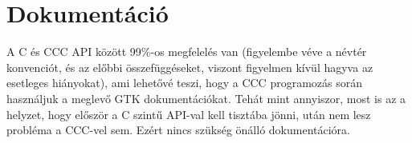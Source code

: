 \section{Dokumentáció}
A C és CCC API között  99\%-os megfelelés van
(figyelembe véve a névtér konvenciót, és az előbbi összefüggéseket, 
viszont figyelmen kívül hagyva az esetleges hiányokat), 
ami lehetővé teszi, hogy a CCC programozás során használjuk a meglevő 
GTK dokumentációkat. Tehát mint annyiszor, most is az a helyzet,
hogy először a C szintű API-val kell tisztába jönni, után nem
lesz probléma a CCC-vel sem. Ezért nincs szükség önálló 
dokumentációra.

